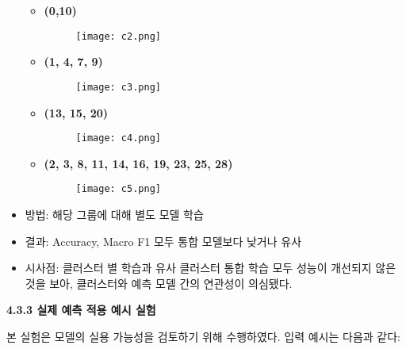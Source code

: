 \documentclass[sigconf]{acmart}
\begin{document}
\begin{CJK}{UTF8}{mj}
\begin{itemize}
\begin{itemize}
  \vspace{5em}
  \item \textbf{(0,10)}
    \vspace{-1em}
    \begin{figure}[H]
    \centering
    \texttt{[image: c2.png]}
    \label{fig:integrated_cluster_1}
    \end{figure}
  \vspace{-0.5em}
  \item \textbf{(1, 4, 7, 9)}
    \vspace{-1em}
    \begin{figure}[H]
    \centering
    \texttt{[image: c3.png]}
    \label{fig:integrated_cluster_2}
    \end{figure}
  \vspace{-0.5em}
  \item \textbf{(13, 15, 20)}
    \vspace{-1em}
    \begin{figure}[H]
    \centering
    \texttt{[image: c4.png]}
    \label{fig:integrated_cluster_3}
    \end{figure}
  \vspace{-0.5em}
  \item \textbf{(2, 3, 8, 11, 14, 16, 19, 23, 25, 28)}
    \vspace{-1em}
    \begin{figure}[H]
    \centering
    \texttt{[image: c5.png]}
    \label{fig:integrated_cluster_4}
    \end{figure}
\end{itemize}

  \item 방법: 해당 그룹에 대해 별도 모델 학습
  \item 결과: Accuracy, Macro F1 모두 통합 모델보다 낮거나 유사
  \item 시사점: 클러스터 별 학습과 유사 클러스터 통합 학습 모두 성능이 개선되지 않은 것을 보아, 클러스터와 예측 모델 간의 연관성이 의심됐다.
\end{itemize}

\vspace{0.5em}
\noindent\textbf{4.3.3 실제 예측 적용 예시 실험}\par
본 실험은 모델의 실용 가능성을 검토하기 위해 수행하였다.  
입력 예시는 다음과 같다:


\end{CJK}
\end{document}
